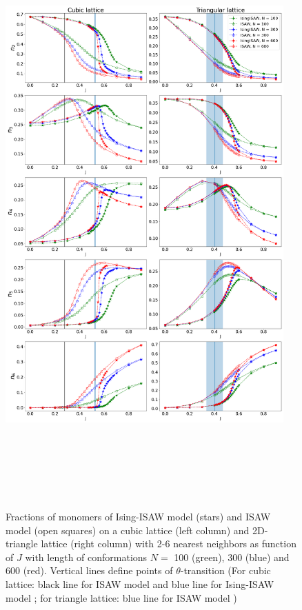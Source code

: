 \begin{figure}
    \centering
    \includegraphics[width=0.95\textwidth, height=22.5cm]{Images/Ising_vs_ISAW.png}
    \caption{Fractions of monomers of Ising-ISAW model (stars) and ISAW model (open squares) on a cubic lattice (left column) and 2D-triangle lattice (right column) with 2-6 nearest neighbors as function of $J$ with length of conformations $N = $ 100 (green), 300 (blue) and 600 (red). Vertical lines define points of $\theta$-transition (For cubic lattice: black line for ISAW model \cite{Tesi1996} and blue line for Ising-ISAW model \cite{Foster2021}; for triangle lattice: blue line for ISAW model \cite{Privman1986})}
    \label{fig:Ising_vs_ISAW}
\end{figure}

